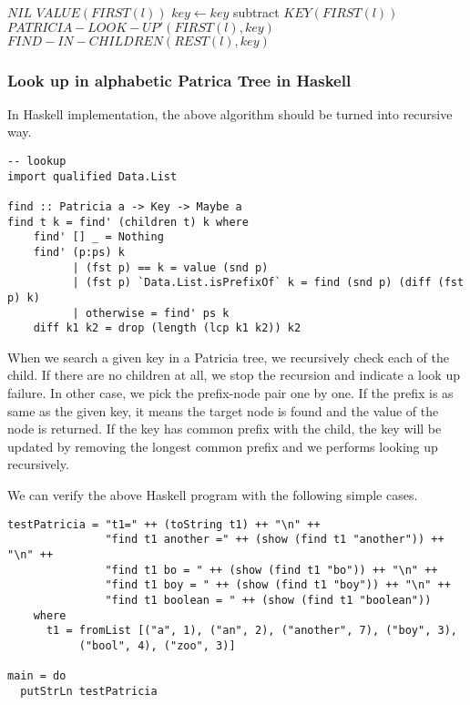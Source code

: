 \documentclass{article}
\begin{document}
\begin{algorithmic}[1]
    \State \Return $NIL$
    \State \Return $VALUE(FIRST(l))$
    \State $key \leftarrow key$ subtract $KEY(FIRST(l))$
    \State \Return $PATRICIA-LOOK-UP'(FIRST(l), key)$
  \Else
    \State \Return $FIND-IN-CHILDREN(REST(l), key)$
  \EndIf
\EndFunction
\end{algorithmic}

\subsubsection*{Look up in alphabetic Patrica Tree in Haskell}
In Haskell implementation, the above algorithm should be turned
into recursive way.

\lstset{language=Haskell}
\begin{lstlisting}
-- lookup
import qualified Data.List

find :: Patricia a -> Key -> Maybe a
find t k = find' (children t) k where
    find' [] _ = Nothing
    find' (p:ps) k
          | (fst p) == k = value (snd p)
          | (fst p) `Data.List.isPrefixOf` k = find (snd p) (diff (fst p) k)
          | otherwise = find' ps k
    diff k1 k2 = drop (length (lcp k1 k2)) k2
\end{lstlisting}

When we search a given key in a Patricia tree, we recursively check each
of the child. If there are no children at all, we stop the recursion and
indicate a look up failure. In other case, we pick the prefix-node pair
one by one. If the prefix is as same as the given key, it means the target
node is found and the value of the node is returned. If the key has common
prefix with the child, the key will be updated by removing the longest
common prefix and we performs looking up recursively.

We can verify the above Haskell program with the following simple cases.

\begin{lstlisting}
testPatricia = "t1=" ++ (toString t1) ++ "\n" ++
               "find t1 another =" ++ (show (find t1 "another")) ++ "\n" ++
               "find t1 bo = " ++ (show (find t1 "bo")) ++ "\n" ++
               "find t1 boy = " ++ (show (find t1 "boy")) ++ "\n" ++
               "find t1 boolean = " ++ (show (find t1 "boolean"))
    where
      t1 = fromList [("a", 1), ("an", 2), ("another", 7), ("boy", 3),
           ("bool", 4), ("zoo", 3)]

main = do
  putStrLn testPatricia
\end{lstlisting}
\end{document}
